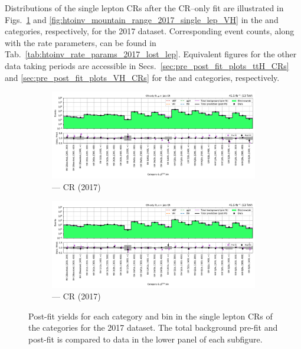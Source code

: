 Distributions of the single lepton \glspl{CR} after the \gls{CR}--only fit are illustrated in Figs.~\ref{fig:htoinv_mountain_range_2017_single_lep_ttH} and \ref{fig:htoinv_mountain_range_2017_single_lep_VH} in the \ttH and \VH categories, respectively, for the 2017 dataset. Corresponding event counts, along with the rate parameters, can be found in Tab.~\ref{tab:htoinv_rate_params_2017_lost_lep}. Equivalent figures for the other data taking periods are accessible in Secs.~\ref{sec:pre_post_fit_plots_ttH_CRs} and \ref{sec:pre_post_fit_plots_VH_CRs} for the \ttH and \VH categories, respectively.

\begin{figure}[htbp]
    \centering
    \begin{subfigure}[b]{\textwidth}
        \includegraphics[width=\textwidth]{chapters/higgstoinv/figures/mountain_ranges/2017/ttH/Wmunu_tree_fit_b-abs_values_ttH_cats.pdf}
        \caption{\ttH --- \singleMuCr \gls{CR} (2017)}
    \end{subfigure}

    \begin{subfigure}[b]{\textwidth}
        \includegraphics[width=\textwidth]{chapters/higgstoinv/figures/mountain_ranges/2017/ttH/Wenu_tree_fit_b-abs_values_ttH_cats.pdf}
        \caption{\ttH --- \singleEleCr \gls{CR} (2017)}
    \end{subfigure}
    \caption[Post-fit yields for each category and \ptmiss bin in the single lepton control regions of the \ttH categories for the 2017 dataset]{Post-fit yields for each category and \ptmiss bin in the single lepton \glspl{CR} of the \ttH categories for the 2017 dataset. The total background pre-fit and post-fit is compared to data in the lower panel of each subfigure.}
    \label{fig:htoinv_mountain_range_2017_single_lep_ttH}
\end{figure}

